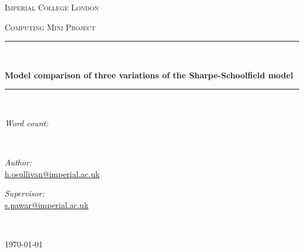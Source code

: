 \documentclass[11pt]{article}
\newcommand{\HRule}{\rule{\linewidth}{0.5mm}} %
\begin{document}
\linenumbers
\date{} %
\begin{titlepage} %
\begin{center} %

\vspace*{.06\textheight}
{\scshape\LARGE Imperial College London\par}\vspace{1.5cm} %
\textsc{\Large Computing Mini Project}\\[0.5cm] %

\HRule \\[0.4cm] %
{\huge \bfseries Model comparison of three variations of the Sharpe-Schoolfield model \par}\vspace{0.4cm} %
\HRule \\[8cm] %

\begin{minipage}[t]{0.4\textwidth}
\begin{center} \large
\emph{Word count:} \\
\end{center}
\end{minipage}\\[3cm]

\begin{minipage}[t]{0.4\textwidth}
\begin{flushleft} \large
\emph{Author:} \\
\href{mailto:h.osullivan@imperial.ac.uk}{h.osullivan@imperial.ac.uk}
\end{flushleft}
\end{minipage}
\begin{minipage}[t]{0.4\textwidth}
\begin{flushright} \large
\emph{Supervisor:} \\
\href{mailto:s.pawar@imperial.ac.uk}{s.pawar@imperial.ac.uk}
\end{flushright}
\end{minipage}\\[3cm]

\vfill

{\large \today}\\[4cm] %


\vfill
\end{center}
\end{titlepage}
\end{document}
